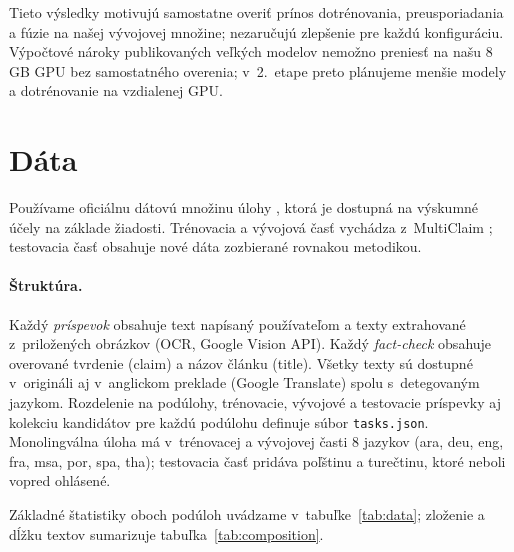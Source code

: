 \documentclass[11pt,a4paper]{article}
\begin{document}
Tieto výsledky motivujú samostatne overiť prínos dotrénovania, preusporiadania a fúzie na našej vývojovej množine; nezaručujú zlepšenie pre každú konfiguráciu.
Výpočtové nároky publikovaných veľkých modelov nemožno preniesť na našu 8\,GB GPU bez samostatného overenia; v~2.~etape preto plánujeme menšie modely a dotrénovanie na vzdialenej GPU.

\section{Dáta}
\label{sec:data}

Používame oficiálnu dátovú množinu úlohy \citep{semeval2025task7-dataset}, ktorá je dostupná na výskumné účely na základe žiadosti.
Trénovacia a vývojová časť vychádza z~MultiClaim \citep{pikuliak-etal-2023-multilingual}; testovacia časť obsahuje nové dáta zozbierané rovnakou metodikou.

\paragraph{Štruktúra.}
Každý \emph{príspevok} obsahuje text napísaný používateľom a texty extrahované z~priložených obrázkov (OCR, Google Vision API).
Každý \emph{fact-check} obsahuje overované tvrdenie (claim) a názov článku (title).
Všetky texty sú dostupné v~origináli aj v~anglickom preklade (Google Translate) spolu s~detegovaným jazykom.
Rozdelenie na podúlohy, trénovacie, vývojové a testovacie príspevky aj kolekciu kandidátov pre každú podúlohu definuje súbor \texttt{tasks.json}.
Monolingválna úloha má v~trénovacej a vývojovej časti 8 jazykov (ara, deu, eng, fra, msa, por, spa, tha); testovacia časť pridáva poľštinu a turečtinu, ktoré neboli vopred ohlásené.

Základné štatistiky oboch podúloh uvádzame v~tabuľke~\ref{tab:data}; zloženie a dĺžku textov sumarizuje tabuľka~\ref{tab:composition}.



\end{document}

